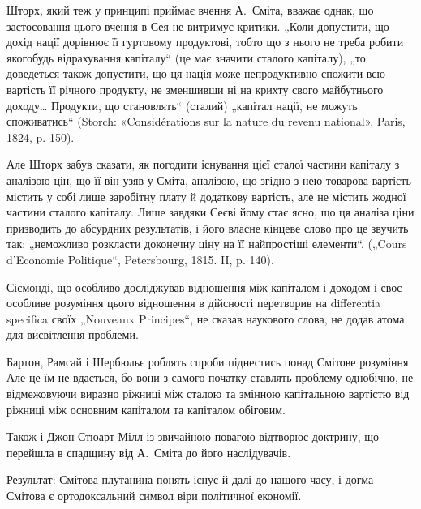 
Шторх, який теж у принципі приймає вчення А.~Сміта, вважає однак,
що застосовання цього вчення в Сея не витримує критики. „Коли
допустити, що дохід нації дорівнює її гуртовому продуктові, тобто що з
нього не треба робити якогобудь відрахування капіталу“ (це має значити
сталого капіталу), „то доведеться також допустити, що ця нація може
непродуктивно спожити всю вартість її річного продукту, не зменшивши
ні на крихту свого майбутнього доходу\dots{} Продукти, що становлять“
(сталий) „капітал нації, не можуть споживатись“ (Storch: «Considérations
sur la nature du revenu national», Paris, 1824, p. 150).

Але Шторх забув сказати, як погодити існування цієї сталої частини
капіталу з аналізою цін, що її він узяв у Сміта, аналізою, що згідно з
нею товарова вартість містить у собі лише заробітну плату й додаткову
вартість, але не містить жодної частини сталого капіталу. Лише завдяки
Сеєві йому стає ясно, що ця аналіза ціни призводить до абсурдних
результатів, і його власне кінцеве слово про це звучить так: „неможливо
розкласти доконечну ціну на її найпростіші елементи“. („Cours d’Economie
Politique“, Petersbourg, 1815. II, p. 140).

Сісмонді, що особливо досліджував відношення між капіталом і доходом
і своє особливе розуміння цього відношення в дійсності перетворив
на differentia specifica своїх „Nouveaux Principes“, не сказав 
наукового слова, не додав  атома для висвітлення проблеми.

Бартон, Рамсай і Шербюльє роблять спроби піднестись понад Смітове
розуміння. Але це їм не вдається, бо вони з самого початку ставлять
проблему однобічно, не відмежовуючи виразно ріжниці між сталою
та змінною капітальною вартістю від ріжниці між основним капіталом та
капіталом обіговим.

Також і Джон Стюарт Мілл із звичайною повагою відтворює доктрину,
що перейшла в спадщину від А.~Сміта до його наслідувачів.

Результат: Смітова плутанина понять існує й далі до нашого часу, і
догма Смітова є ортодоксальний символ віри політичної економії.
\label{original-300-1}


